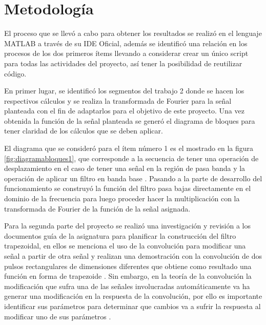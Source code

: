 \section{Metodología}\label{metodologia}
El proceso que se llevó a cabo para obtener los resultados se realizó en el lenguaje MATLAB a través de su IDE Oficial, además se identificó una relación en los procesos de los dos primeros ítems llevando a considerar crear un único script para todas las actividades del proyecto, así tener la posibilidad de reutilizar código.

En primer lugar, se identificó los segmentos del trabajo 2 donde se hacen los respectivos cálculos y se realiza la transformada de Fourier para la señal planteada con el fin de adaptarlos para el objetivo de este proyecto. Una vez obtenida la función de la señal planteada se generó el diagrama de bloques para tener claridad de los cálculos que se deben aplicar.


\vspace{-5mm}

El diagrama que se consideró para el ítem número 1 es el mostrado en la figura \ref{fig:diagramabloques1}, que corresponde a la secuencia de tener una operación de desplazamiento en el caso de tener una señal en la región de pasa banda y la operación de aplicar un filtro en banda base \cite{filtros2021}. Pasando a la parte de desarrollo del funcionamiento se construyó la función del filtro pasa bajas directamente en el dominio de la frecuencia para luego proceder hacer la multiplicación con la transformada de Fourier de la función de la señal asignada.

Para la segunda parte del proyecto se realizó una investigación y revisión a los documentos guía de la asignatura para planificar la construcción del filtro trapezoidal, en ellos se menciona el uso de la convolución para modificar una señal a partir de otra señal y realizan una demostración con la convolución de dos pulsos rectangulares de dimensiones diferentes que obtiene como resultado una función en forma de trapezoide \cite{ejercicio2021}. Sin embargo, en la teoría de la convolución la modificación que sufra una de las señales involucradas automáticamente va ha generar una modificación en la respuesta de la convolución, por ello es importante identificar sus parámetros para determinar que cambios va a sufrir la respuesta al modificar uno de sus parámetros \cite{Chaparro2013}.


\vspace{-5mm}

